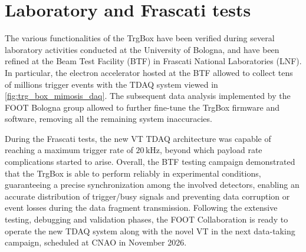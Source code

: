 \section{Laboratory and Frascati tests}\label{sec:trgbox_tests}
The various functionalities of the TrgBox have been verified during several laboratory activities conducted at the University of Bologna, and have been refined at the Beam Test Facility (BTF) in Frascati National Laboratories (LNF). In particular, the electron accelerator hosted at the BTF allowed to collect tens of millions trigger events with the TDAQ system viewed in \autoref{fig:trg_box_mimosis_daq}. The subsequent data analysis implemented by the FOOT Bologna group allowed to further fine-tune the TrgBox firmware and software, removing all the remaining system inaccuracies.

During the Frascati tests, the new VT TDAQ architecture was capable of reaching a maximum trigger rate of $20\,\mathrm{kHz}$, beyond which payload rate complications started to arise. Overall, the BTF testing campaign demonstrated that the TrgBox is able to perform reliably in experimental conditions, guaranteeing a precise synchronization among the involved detectors, enabling an accurate distribution of trigger/busy signals and preventing data corruption or event losses during the data fragment transmission. Following the extensive testing, debugging and validation phases, the FOOT Collaboration is ready to operate the new TDAQ system along with the novel VT in the next data-taking campaign, scheduled at CNAO in November 2026.
